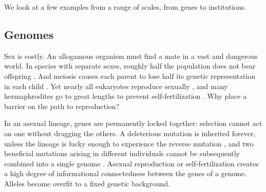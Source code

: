 \documentclass[11pt]{article}
\begin{document}
We look at a few examples from a range of scales, from genes to institutions.




\subsection{Genomes} 

Sex is costly. An allogamous organism must find a mate in a vast and dangerous world. In species with separate sexes, roughly half the population does not bear offspring \citep{smith1971origin}. And meiosis causes each parent to lose half its genetic representation in each child \citep{williams1975sex}. Yet nearly all eukaryotes reproduce sexually \citep{speijer2015sex}, and many hermaphrodites go to great lengths to prevent self-fertilization \citep{charlesworth2005plant}. Why place a barrier on the path to reproduction? 

In an asexual lineage, genes are permanently locked together: selection cannot act on one without dragging the others. A deleterious mutation is inherited forever, unless the lineage is lucky enough to experience the reverse mutation \citep{muller1964relation}, and two beneficial mutations arising in different individuals cannot be subsequently combined into a single genome \citep{muller1932some,fisher1930genetical}. Asexual reproduction or self-fertilization creates a high degree of informational connectedness between the genes of a genome. Alleles become overfit to a fixed genetic background. 
\end{document}

